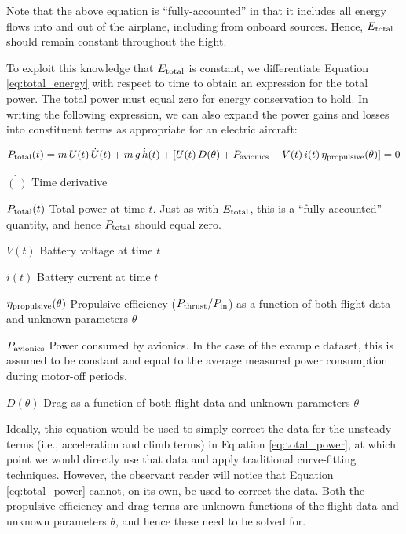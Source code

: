 \noindent Note that the above equation is ``fully-accounted'' in that it includes all energy flows into and out of the airplane, including from onboard sources. Hence, $E_{\rm total}$ should remain constant throughout the flight.

To exploit this knowledge that $E_{\rm total}$ is constant, we differentiate Equation \ref{eq:total_energy} with respect to time to obtain an expression for the total power. The total power must equal zero for energy conservation to hold. In writing the following expression, we can also expand the power gains and losses into constituent terms as appropriate for an electric aircraft:

\begin{equation}
    P_{\rm total}(t) =
    m \, U(t) \, \dot{U}(t)
    + m \, g \, \dot{h}(t)
    + \left[
        U(t) \, D(\theta)
        + P_{\rm avionics}
        - V(t) \, i(t) \, \eta_{\rm propulsive}(\theta)
        \right] = 0
    \label{eq:total_power}
\end{equation}

\begin{eqexpl}
    \item {$\dot{(\:)}$} Time derivative
    \item {$P_{\rm total}(t)$} Total power at time $t$. Just as with $E_{\rm total}$, this is a ``fully-accounted'' quantity, and hence $P_{\rm total}$ should equal zero.
    \item {$V(t)$} Battery voltage at time $t$
    \item {$i(t)$} Battery current at time $t$
    \item {$\eta_{\rm propulsive}(\theta)$} Propulsive efficiency ($P_{\rm thrust} / P_{\rm in}$) as a function of both flight data and unknown parameters $\theta$
    \item {$P_{\rm avionics}$} Power consumed by avionics. In the case of the example dataset, this is assumed to be constant and equal to the average measured power consumption during motor-off periods.
    \item {$D(\theta)$} Drag as a function of both flight data and unknown parameters $\theta$
\end{eqexpl}

Ideally, this equation would be used to simply correct the data for the unsteady terms (i.e., acceleration and climb terms) in Equation \ref{eq:total_power}, at which point we would directly use that data and apply traditional curve-fitting techniques. However, the observant reader will notice that Equation \ref{eq:total_power} cannot, on its own, be used to correct the data. Both the propulsive efficiency and drag terms are unknown functions of the flight data and unknown parameters $\theta$, and hence these need to be solved for.

